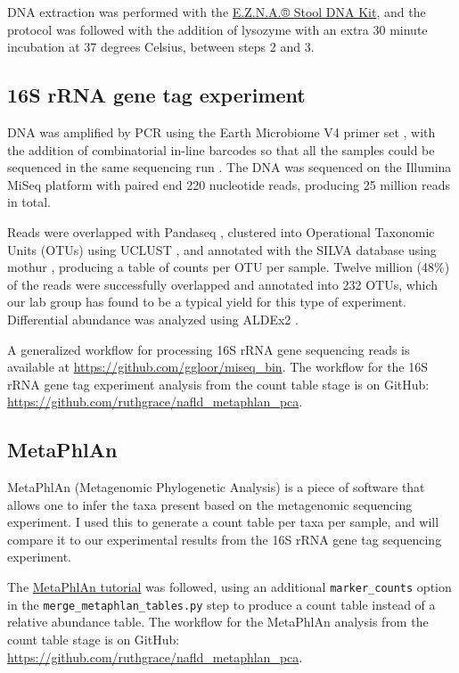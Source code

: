 DNA extraction was performed with the \href{http://omegabiotek.com/store/product/stool-dna-kit/}{E.Z.N.A.® Stool DNA Kit}, and the protocol was followed with the addition of lysozyme with an extra 30 minute incubation at 37 degrees Celsius, between steps 2 and 3.

\subsection{16S rRNA gene tag experiment}

DNA was amplified by PCR using the Earth Microbiome V4 primer set \cite{caporaso2012ultra}, with the addition of combinatorial in-line barcodes so that all the samples could be sequenced in the same sequencing run \cite{gloor2010microbiome}. The DNA was sequenced on the Illumina MiSeq platform with paired end 220 nucleotide reads, producing 25 million reads in total.

Reads were overlapped with Pandaseq \cite{masella2012pandaseq}, clustered into Operational Taxonomic Units (OTUs) using UCLUST \cite{edgar2010search}, and annotated with the SILVA database \cite{quast2013silva} using mothur \cite{schloss2009introducing}, producing a table of counts per OTU per sample. Twelve million (48\%) of the reads were successfully overlapped and annotated into 232 OTUs, which our lab group has found to be a typical yield for this type of experiment. Differential abundance was analyzed using ALDEx2 \cite{fernandes2014unifying}.

A generalized workflow for processing 16S rRNA gene sequencing reads is available at \url{https://github.com/ggloor/miseq_bin}. The workflow for the 16S rRNA gene tag experiment analysis from the count table stage is on GitHub: \url{https://github.com/ruthgrace/nafld_metaphlan_pca}.

\subsection{MetaPhlAn}

MetaPhlAn (Metagenomic Phylogenetic Analysis) \cite{segata2012metagenomic} is a piece of software that allows one to infer the taxa present based on the metagenomic sequencing experiment. I used this to generate a count table per taxa per sample, and will compare it to our experimental results from the 16S rRNA gene tag sequencing experiment.

The \href{https://bitbucket.org/nsegata/metaphlan/wiki/MetaPhlAn_Pipelines_Tutorial}{MetaPhlAn tutorial} was followed, using an additional \verb|marker_counts| option in the \verb|merge_metaphlan_tables.py| step to produce a count table instead of a relative abundance table. The workflow for the MetaPhlAn analysis from the count table stage is on GitHub: \url{https://github.com/ruthgrace/nafld_metaphlan_pca}.

